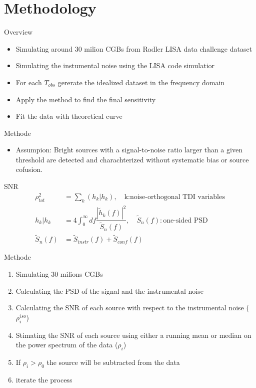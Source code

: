 \documentclass[pdf]{beamer}
\begin{document}
\section{Methodology}
\begin{frame}{Overview}
\begin{itemize}
\item Simulating around 30 milion CGBs from Radler LISA data challenge dataset
\item Simulating the instumental noise using the LISA code simulatior
\item For each $T_{obs}$ gererate the idealized dataset in the frequency domain
\item Apply the method to find the final sensitivity
\item Fit the data with theoretical curve
\end{itemize}
\end{frame}

\begin{frame}{Methode}
\begin{itemize}
\item Assumpion: Bright sources with a signal-to-noise ratio larger than a given threshold are detected and charachterized without systematic bias or source cofusion.
\end{itemize}
\begin{block}{SNR}
\begin{align*}
\rho^2_{tot} &= \sum_k (h_k|h_k), \quad  \text{k:noise-orthogonal TDI variables} \\
h_k|h_k &= 4 \int_{0}^{\infty} df \dfrac{|\tilde{h}_k(f)|^2}{\tilde{S}_n(f)}, \quad \tilde{S}_n(f):\text{one-sided PSD} \\
\tilde{S}_n(f) &= \tilde{S}_{instr}(f) +\tilde{S}_{conf}(f)
\end{align*}
\end{block}
\end{frame}

\begin{frame}{Methode}
\begin{enumerate}
\item Simulating 30 milions CGBs
\item Calculating the PSD of the signal and the instrumental noise
\item Calculating the SNR of each source with respect to the instrumental noise ($\rho_i^{iso}$)
\item Stimating the SNR of each source using either a running mean or median on the power spectrum of the data ($\rho_i$)
\item If $\rho_i > \rho_0$ the source will be subtracted from the data
\item iterate the process
\end{enumerate}
\end{frame}
\end{document}
